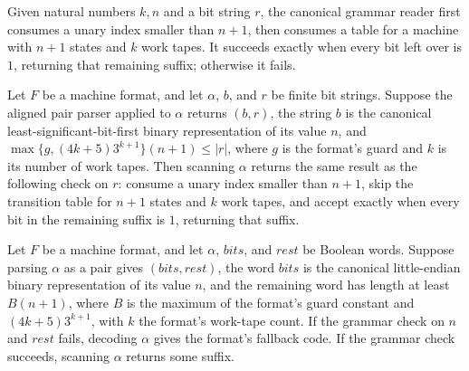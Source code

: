 \begin{definition}
\label{Turing.MachineFormat.canonGrammar}
\leanok
{}
Given natural numbers $k,n$ and a bit string $r$, the canonical grammar reader first
consumes a unary index smaller than $n+1$, then consumes a table for a machine with
$n+1$ states and $k$ work tapes. It succeeds exactly when every bit left over is $1$,
returning that remaining suffix; otherwise it fails.
\end{definition}

\begin{lemma}
\label{Turing.MachineFormat.scan_eq_canonGrammar}
\leanok
{}
Let $F$ be a machine format, and let $\alpha$, $b$, and $r$ be finite bit strings.
Suppose the aligned pair parser applied to $\alpha$ returns $(b,r)$, the string $b$ is
the canonical least-significant-bit-first binary representation of its value $n$, and
$\max\{g,(4k+5)3^{k+1}\}(n+1)\le |r|$, where $g$ is the format's guard and $k$ is its
number of work tapes. Then scanning $\alpha$ returns the same result as the following
check on $r$: consume a unary index smaller than $n+1$, skip the transition table for
$n+1$ states and $k$ work tapes, and accept exactly when every bit in the remaining
suffix is $1$, returning that suffix.
\end{lemma}

\begin{lemma}
\label{Turing.MachineFormat.canonGrammar_verdict}
\leanok
{}
Let $F$ be a machine format, and let $\alpha$, $bits$, and $rest$ be Boolean words.
Suppose parsing $\alpha$ as a pair gives $(bits,rest)$, the word $bits$ is the canonical
little-endian binary representation of its value $n$, and the remaining word has length
at least $B(n+1)$, where $B$ is the maximum of the format's guard constant and
$(4k+5)3^{k+1}$, with $k$ the format's work-tape count. If the grammar check on $n$ and
$rest$ fails, decoding $\alpha$ gives the format's fallback code. If the grammar check
succeeds, scanning $\alpha$ returns some suffix.
\end{lemma}

